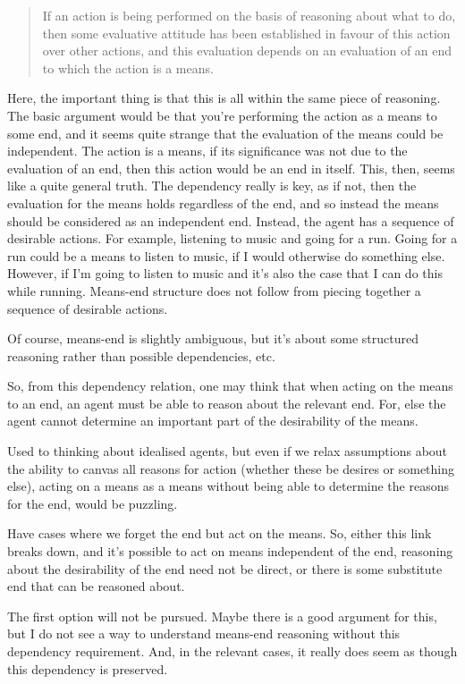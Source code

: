 \documentclass[10pt]{article}
\begin{document}
\begin{quote}
  If an action is being performed on the basis of reasoning about what to do, then some evaluative attitude has been established in favour of this action over other actions, and this evaluation depends on an evaluation of an end to which the action is a means.
\end{quote}
Here, the important thing is that this is all within the same piece of reasoning.
The basic argument would be that you're performing the action as a means to some end, and it seems quite strange that the evaluation of the means could be independent.
The action is a means, if its significance was not due to the evaluation of an end, then this action would be an end in itself.
This, then, seems like a quite general truth.
The dependency really is key, as if not, then the evaluation for the means holds regardless of the end, and so instead the means should be considered as an independent end.
Instead, the agent has a sequence of desirable actions.
For example, listening to music and going for a run.
Going for a run could be a means to listen to music, if I would otherwise do something else.
However, if I'm going to listen to music and it's also the case that I can do this while running.
Means-end structure does not follow from piecing together a sequence of desirable actions.

Of course, means-end is slightly ambiguous, but it's about some structured reasoning rather than possible dependencies, etc.

So, from this dependency relation, one may think that when acting on the means to an end, an agent must be able to reason about the relevant end.
For, else the agent cannot determine an important part of the desirability of the means.

Used to thinking about idealised agents, but even if we relax assumptions about the ability to canvas all reasons for action (whether these be desires or something else), acting on a means as a means without being able to determine the reasons for the end, would be puzzling.

Have cases where we forget the end but act on the means.
So, either this link breaks down, and it's possible to act on means independent of the end, reasoning about the desirability of the end need not be direct, or there is some substitute end that can be reasoned about.

The first option will not be pursued.
Maybe there is a good argument for this, but I do not see a way to understand means-end reasoning without this dependency requirement.
And, in the relevant cases, it really does seem as though this dependency is preserved.
\end{document}
